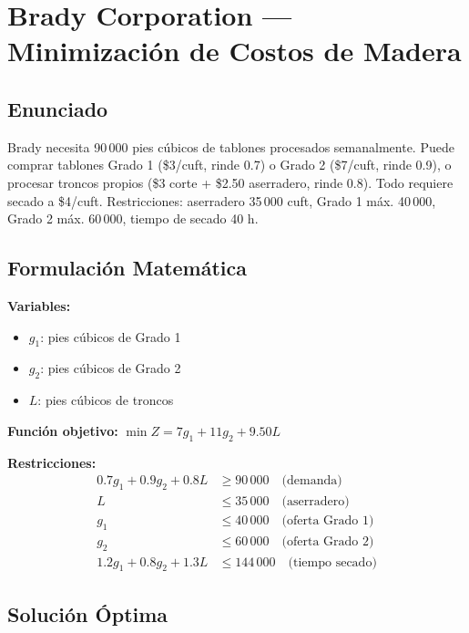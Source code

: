 \documentclass[12pt,a4paper]{article}
\begin{document}
\section{Brady Corporation --- Minimización de Costos de Madera}

\subsection{Enunciado}

Brady necesita 90\,000 pies cúbicos de tablones procesados semanalmente. Puede comprar tablones Grado 1 (\$3/cuft, rinde 0.7) o Grado 2 (\$7/cuft, rinde 0.9), o procesar troncos propios (\$3 corte + \$2.50 aserradero, rinde 0.8). Todo requiere secado a \$4/cuft. Restricciones: aserradero 35\,000 cuft, Grado 1 máx. 40\,000, Grado 2 máx. 60\,000, tiempo de secado 40 h.

\subsection{Formulación Matemática}

\textbf{Variables:}
\begin{itemize}[nosep]
    \item $g_1$: pies cúbicos de Grado 1
    \item $g_2$: pies cúbicos de Grado 2
    \item $L$: pies cúbicos de troncos
\end{itemize}

\textbf{Función objetivo:} $\min Z = 7g_1 + 11g_2 + 9.50L$

\textbf{Restricciones:}
\begin{align}
0.7g_1 + 0.9g_2 + 0.8L &\geq 90\,000 \quad \text{(demanda)} \\
L &\leq 35\,000 \quad \text{(aserradero)} \\
g_1 &\leq 40\,000 \quad \text{(oferta Grado 1)} \\
g_2 &\leq 60\,000 \quad \text{(oferta Grado 2)} \\
1.2g_1 + 0.8g_2 + 1.3L &\leq 144\,000 \quad \text{(tiempo secado)}
\end{align}

\subsection{Solución Óptima}
\end{document}
